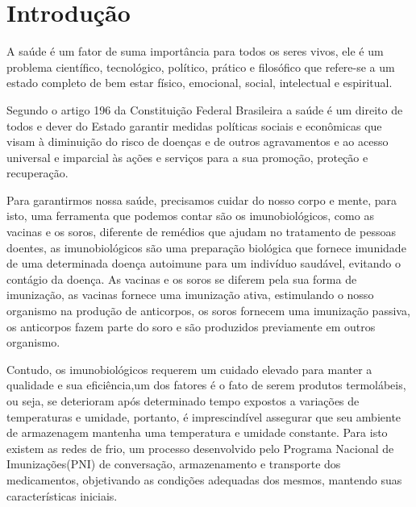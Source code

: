 \chapter*[Introdução]{Introdução}

A saúde é um fator de suma importância para todos os seres vivos, ele é um problema científico, tecnológico, político, prático e filosófico que refere-se a um estado completo de bem estar físico, emocional, social, intelectual e espiritual\cite{almeida2011saude}. 

Segundo o artigo 196 da Constituição Federal Brasileira a saúde é um direito de todos e dever do Estado garantir medidas políticas sociais e econômicas que visam à diminuição do risco de doenças e de outros agravamentos e ao acesso universal e imparcial às ações e serviços para a sua promoção, proteção e recuperação\cite{de2013direito}.

Para garantirmos nossa saúde, precisamos cuidar do nosso corpo e mente, para isto, uma ferramenta que podemos contar são os imunobiológicos, como as vacinas e os soros, diferente de remédios que ajudam no tratamento de pessoas doentes, as imunobiológicos são uma preparação biológica que fornece imunidade de uma determinada doença autoimune para um indivíduo saudável, evitando o contágio da doença. As vacinas e os soros se diferem pela sua forma de imunização, as vacinas fornece uma imunização ativa, estimulando o nosso organismo na produção de anticorpos, os soros fornecem uma imunização passiva, os anticorpos fazem parte do soro e são produzidos previamente em outros organismo\cite{soma2018tratamento}.

Contudo, os imunobiológicos requerem um cuidado elevado para manter a qualidade e sua eficiência,um dos fatores é o fato de serem produtos termolábeis, ou seja,  se deterioram após determinado tempo expostos a variações de temperaturas e umidade, portanto, é imprescindível assegurar que seu ambiente de armazenagem mantenha uma temperatura e umidade constante\cite{ministerio2001manual}. Para isto existem as redes de frio, um processo desenvolvido pelo Programa Nacional de Imunizações(PNI) de conversação, armazenamento e transporte dos medicamentos, objetivando as condições adequadas dos mesmos, mantendo suas características iniciais\cite{ministerio2001manual}.